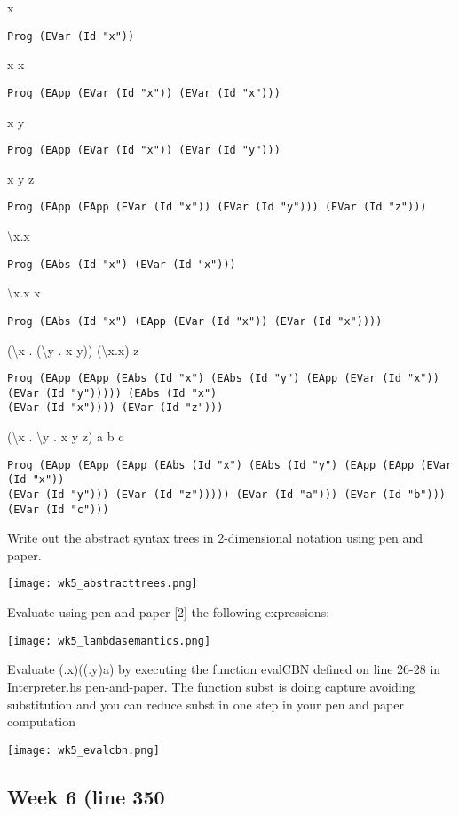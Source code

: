 \documentclass{article}
\theoremstyle{theorem}
\theoremstyle{definition}
\theoremstyle{remark}
\begin{document}
\parindent x
\begin{verbatim}
Prog (EVar (Id "x"))
\end{verbatim}
x x
\begin{verbatim}
Prog (EApp (EVar (Id "x")) (EVar (Id "x")))
\end{verbatim}
x y
\begin{verbatim}
Prog (EApp (EVar (Id "x")) (EVar (Id "y")))
\end{verbatim}
x y z
\begin{verbatim}
Prog (EApp (EApp (EVar (Id "x")) (EVar (Id "y"))) (EVar (Id "z")))
\end{verbatim}
\textbackslash x.x
\begin{verbatim}
Prog (EAbs (Id "x") (EVar (Id "x")))
\end{verbatim}
\textbackslash x.x x
\begin{verbatim}
Prog (EAbs (Id "x") (EApp (EVar (Id "x")) (EVar (Id "x"))))
\end{verbatim}
(\textbackslash x . (\textbackslash y . x y)) (\textbackslash x.x) z
\begin{verbatim}
Prog (EApp (EApp (EAbs (Id "x") (EAbs (Id "y") (EApp (EVar (Id "x")) (EVar (Id "y"))))) (EAbs (Id "x") 
(EVar (Id "x")))) (EVar (Id "z")))
\end{verbatim}
(\textbackslash x . \textbackslash y . x y z) a b c
\begin{verbatim}
Prog (EApp (EApp (EApp (EAbs (Id "x") (EAbs (Id "y") (EApp (EApp (EVar (Id "x")) 
(EVar (Id "y"))) (EVar (Id "z"))))) (EVar (Id "a"))) (EVar (Id "b"))) (EVar (Id "c")))
\end{verbatim}

Write out the abstract syntax trees in 2-dimensional notation using pen and paper.

\texttt{[image: wk5\_abstracttrees.png]}

Evaluate using pen-and-paper [2] the following expressions:

\texttt{[image: wk5\_lambdasemantics.png]}

Evaluate (\x.x)((\y.y)a) by executing the function evalCBN defined on line 26-28 in Interpreter.hs pen-and-paper. The function subst is doing capture avoiding substitution and you can reduce subst in one step in your pen and paper computation

\texttt{[image: wk5\_evalcbn.png]}

\subsection{Week 6 (line 350}
\end{document}
